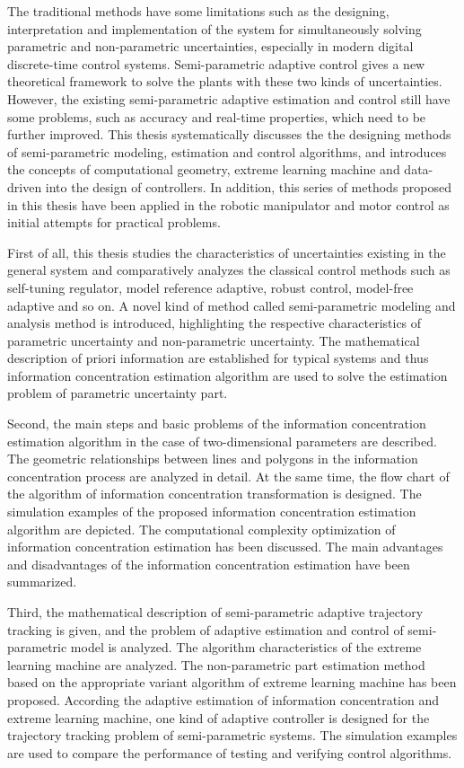 \begin{englishabstract}

The traditional methods have some limitations such as the designing, interpretation and implementation of the system for simultaneously solving parametric and non-parametric uncertainties, especially in modern digital discrete-time control systems. Semi-parametric adaptive control gives a new theoretical framework to solve the plants with these two kinds of uncertainties. However, the existing semi-parametric adaptive estimation and control still have some problems, such as accuracy and real-time properties, which need to be further improved. This thesis systematically discusses the  the designing methods of semi-parametric modeling, estimation and control algorithms, and introduces the concepts of computational geometry, extreme learning machine and data-driven into the design of controllers. In addition, this series of methods proposed in this thesis have been applied in the robotic manipulator and motor control as initial attempts for practical problems. 

First of all, this thesis studies the characteristics of uncertainties existing in the general system and comparatively analyzes the classical control methods such as self-tuning regulator, model reference adaptive, robust control, model-free adaptive and so on. A novel kind of method called semi-parametric modeling and analysis method is introduced, highlighting the respective characteristics of parametric uncertainty and non-parametric uncertainty. The mathematical description of priori information are established for typical systems and thus information concentration estimation algorithm are used to solve the estimation problem of parametric uncertainty part.

Second, the main steps and basic problems of the information concentration estimation algorithm in the case of two-dimensional parameters are described. The geometric relationships between lines and polygons in the information concentration process are analyzed in detail. At the same time, the flow chart of the algorithm of information concentration transformation is designed. The simulation examples of the proposed information concentration estimation algorithm are depicted. The computational complexity optimization of information concentration estimation has been discussed. The main advantages and disadvantages of the information concentration estimation have been summarized.

Third, the mathematical description of semi-parametric adaptive trajectory tracking is given, and the problem of adaptive estimation and control of semi-parametric model is analyzed. The algorithm characteristics of the extreme learning machine are analyzed. The non-parametric part estimation method based on the appropriate variant algorithm of extreme learning machine has been proposed. According the adaptive estimation of information concentration and extreme learning machine, one kind of adaptive controller is designed for the trajectory tracking problem of semi-parametric systems. The simulation examples are used to compare the performance of testing and verifying control algorithms.


\end{englishabstract}
